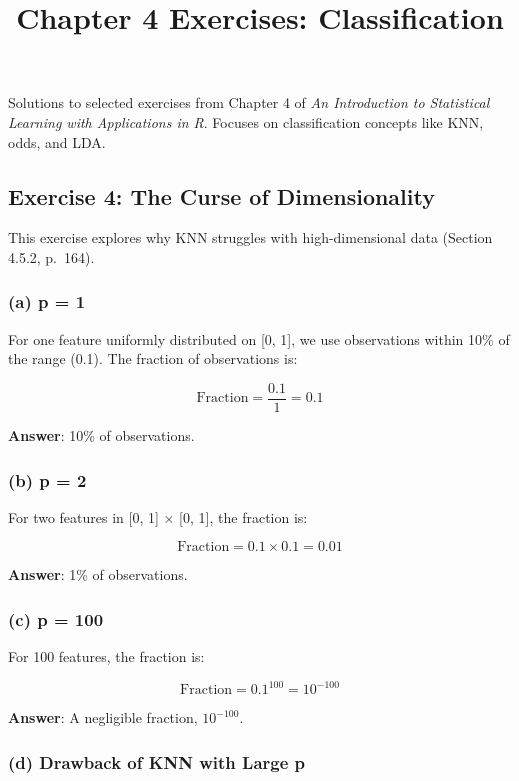 \documentclass[
]{article}
\title{Chapter 4 Exercises: Classification}
\author{}
\date{\vspace{-2.5em}}
\begin{document}
\maketitle

Solutions to selected exercises from Chapter 4 of \emph{An Introduction
to Statistical Learning with Applications in R}. Focuses on
classification concepts like KNN, odds, and LDA.

\subsection{Exercise 4: The Curse of
Dimensionality}\label{exercise-4-the-curse-of-dimensionality}

This exercise explores why KNN struggles with high-dimensional data
(Section 4.5.2, p.~164).

\subsubsection{(a) p = 1}\label{a-p-1}

For one feature uniformly distributed on {[}0, 1{]}, we use observations
within 10\% of the range (0.1). The fraction of observations is:

\[ \text{Fraction} = \frac{0.1}{1} = 0.1 \]

\textbf{Answer}: 10\% of observations.

\subsubsection{(b) p = 2}\label{b-p-2}

For two features in {[}0, 1{]} × {[}0, 1{]}, the fraction is:

\[ \text{Fraction} = 0.1 \times 0.1 = 0.01 \]

\textbf{Answer}: 1\% of observations.

\subsubsection{(c) p = 100}\label{c-p-100}

For 100 features, the fraction is:

\[ \text{Fraction} = 0.1^{100} = 10^{-100} \]

\textbf{Answer}: A negligible fraction, \(10^{-100}\).

\subsubsection{(d) Drawback of KNN with Large
p}\label{d-drawback-of-knn-with-large-p}
\end{document}
